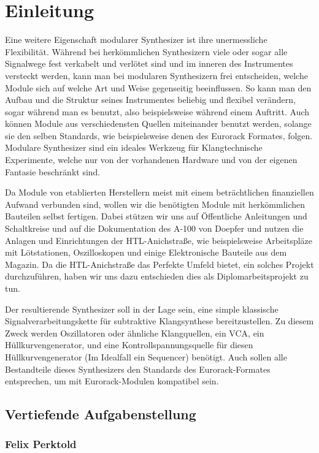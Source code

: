 \chapter{Einleitung}

Eine weitere Eigenschaft modularer Synthesizer ist ihre unermessliche Flexibilität. Während bei herkömmlichen Synthesizern viele oder sogar alle Signalwege fest verkabelt und verlötet sind und im inneren des Instrumentes versteckt werden, kann man bei modularen Synthesizern frei entscheiden, welche Module sich auf welche Art und Weise gegenseitig beeinflussen. So kann man den Aufbau und die Struktur seines Instrumentes beliebig und flexibel verändern, sogar während man es benutzt, also beispielsweise während einem Auftritt. Auch können Module aus verschiedensten Quellen miteinander benutzt werden, solange sie den selben Standards, wie beispielsweise denen des Eurorack Formates, folgen. Modulare Synthesizer sind ein ideales Werkzeug für Klangtechnische Experimente, welche nur von der vorhandenen Hardware und von der eigenen Fantasie beschränkt sind.

Da Module von etablierten Herstellern meist mit einem beträchtlichen finanziellen Aufwand verbunden sind, wollen wir die benötigten Module mit herkömmlichen Bauteilen selbst fertigen. Dabei stützen wir uns auf Öffentliche Anleitungen und Schaltkreise und auf die Dokumentation des A-100 von Doepfer und nutzen die Anlagen und Einrichtungen der HTL-Anichstraße, wie beispielsweise Arbeitspläze mit Lötstationen, Oszilloskopen und einige Elektronische Bauteile aus dem Magazin. Da die HTL-Anichstraße das Perfekte Umfeld bietet, ein solches Projekt durchzuführen, haben wir uns dazu entschieden dies als Diplomarbeitsprojekt zu tun.

Der resultierende Synthesizer soll in der Lage sein, eine simple klassische Signalverarbeitungskette für subtraktive Klangsynthese bereitzustellen. Zu diesem Zweck werden Oszillatoren oder ähnliche Klangquellen, ein \ac{VCA}, ein Hüllkurvengenerator, und eine Kontrollspannungsquelle für diesen Hüllkurvengenerator (Im Idealfall ein Sequencer) benötigt. Auch sollen alle Bestandteile dieses Synthesizers den Standards des Eurorack-Formates entsprechen, um mit Eurorack-Modulen kompatibel sein.

\section{Vertiefende Aufgabenstellung}

\subsection{Felix Perktold}

